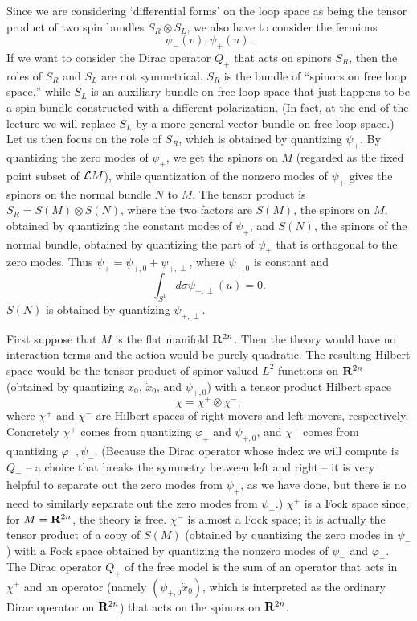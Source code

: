 Since we are considering `differential forms' on the loop space as
being the tensor product of two spin bundles $S_R\otimes S_L$,
we also have to consider the fermions $$\psi_-(v),\psi_+(u).$$
If we want to consider the Dirac operator $Q_+$ that acts on spinors
$S_R$, then the roles of $S_R$ and $S_L$ are not symmetrical.
$S_R$ is the bundle of ``spinors on free loop space,'' while
$S_L$ is an auxiliary bundle on free loop space that just happens
to be a spin bundle constructed with a different polarization.
(In fact, at the end of the lecture we will replace $S_L$ by a more
general vector bundle on free loop space.)  Let us then focus on the
role of $S_R$, which is obtained by quantizing $\psi_+$.  By quantizing
the zero modes of $\psi_+$, we get the spinors on 
$M$ (regarded as the fixed point subset of ${\cal L}M$), 
while quantization of the nonzero modes of $\psi_+$ gives the
spinors on the normal bundle $N$ to $M$.  The tensor product is
$S_R=S(M)\otimes S(N)$, where the two factors are $S(M)$, the spinors
on $M$, obtained by quantizing the constant modes of $\psi_+$,
and $S(N)$, the spinors of the normal bundle, obtained by quantizing
the part of $\psi_+$ that is orthogonal to the zero modes. 
Thus $\psi_+=\psi_{+,0}+\psi_{+,\perp}$, where
$\psi_{+,0}$ is constant and 
$$\int_{S^1}d\sigma \psi_{+,\perp}(u)=0.$$
$S(N)$ is obtained by quantizing $\psi_{+,\perp}$.

First suppose that $M$ is the flat manifold ${\bf R}^{2n}$. Then the
theory would have no interaction terms and the action would be purely
quadratic. The resulting Hilbert space would be the tensor product of
spinor-valued $L^2$ functions on ${\bf R}^{2n}$ (obtained by quantizing $x_0$,
$\dot x_0$, and $\psi_{+,0}$) 
 with a tensor product Hilbert space
$$\chi=\chi^+\otimes \chi^-,$$
where $\chi^+$ and $\chi^-$ are Hilbert spaces of right-movers and left-movers,
respectively.  Concretely
$\chi^+$ comes from quantizing   $\varphi_+$ and $\psi_{+,0}$,
and $\chi^-$ comes from quantizing $\varphi_-,\psi_-$.  (Because the
Dirac operator whose index we will compute is $Q_+$ -- a choice that
breaks the symmetry between left and right -- it is very helpful
to separate out the zero modes from $\psi_+$, as we have done, but there
is no need to similarly separate out the zero modes from $\psi_-$.)
 $\chi^+$  is a  Fock space since, for $M={\bf R}^{2n}$,
the theory is free.  $\chi^-$ is almost a Fock space; it is actually
the tensor product of a copy of $S(M)$ (obtained by quantizing the zero
modes in $\psi_-$) with a Fock space obtained by quantizing the nonzero
modes of $\psi_-$ and $\varphi_-$.  The Dirac operator $Q_+$ of the free
model is the sum of an operator that acts in $\chi^+$ and an operator
(namely $(\psi_{+,0}\dot x_0)$, which is interpreted as the ordinary
Dirac operator on ${\bf R}^{2n}$) that acts on the spinors on ${\bf R}^{2n}$.

